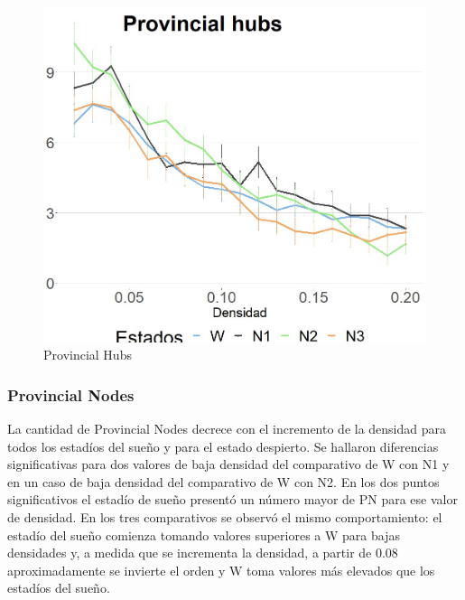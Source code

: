 \begin{figure}[H]
    \centering
    \includegraphics[width = 5in]{img/5_provincialhubs.jpg}
    \caption{Provincial Hubs}
    \label{fig:5_provincialhubs}
\end{figure}


\subsubsection{Provincial Nodes}
La cantidad de Provincial Nodes decrece con el incremento de la densidad para todos los estadíos del sueño y para el estado despierto. Se hallaron diferencias significativas para dos valores de baja densidad del comparativo de W con N1
y en un caso de baja densidad del comparativo de W con N2. En los dos puntos significativos el estadío de sueño presentó un número mayor de PN para ese valor de densidad. En los tres comparativos se observó el mismo comportamiento: el estadío del sueño comienza tomando valores superiores a W para bajas densidades y, a medida que se incrementa la densidad, a partir de 0.08 aproximadamente se invierte el orden y W toma valores más elevados que los estadíos del sueño.


